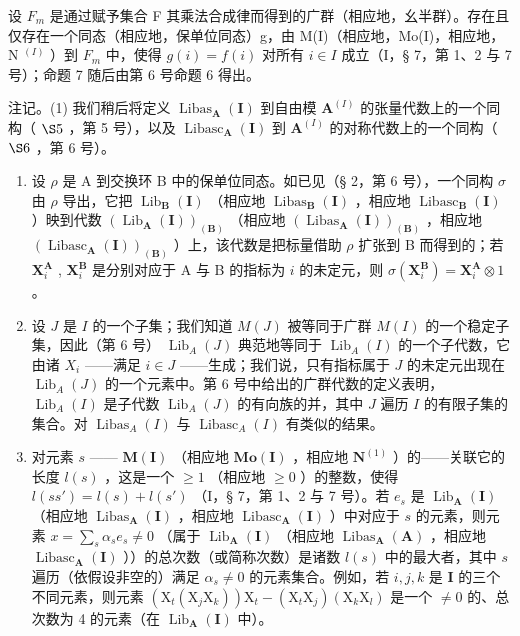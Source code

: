 设 \(F_{m}\) 是通过赋予集合 F 其乘法合成律而得到的广群（相应地，幺半群）。存在且仅存在一个同态（相应地，保单位同态）g，由 M(I)（相应地，Mo(I)，相应地，N \(^{(I)}\) ）到 \(F_{m}\) 中，使得 \(g(i) = f(i)\) 对所有 \(i \in I\) 成立（I，§ 7，第 1、2 与 7 号）；命题 7 随后由第 6 号命题 6 得出。

注记。(1) 我们稍后将定义 \(\operatorname{Libas}_{\mathbf{A}}(\mathbf{I})\) 到自由模 \(\mathbf{A}^{(I)}\) 的张量代数上的一个同构（ \(\S 5\) ，第 5 号），以及 \(\operatorname{Libasc}_{\mathbf{A}}(\mathbf{I})\) 到 \(\mathbf{A}^{(I)}\) 的对称代数上的一个同构（ \(\S 6\) ，第 6 号）。

\begin{enumerate}
\def\labelenumi{(\arabic{enumi})}
\setcounter{enumi}{1}
\item
  设 \(\rho\) 是 A 到交换环 B 中的保单位同态。如已见（§ 2，第 6 号），一个同构 \(\sigma\) 由 \(\rho\) 导出，它把 \(\operatorname{Lib}_{\mathbf{B}}(\mathbf{I})\) （相应地 \(\operatorname{Libas}_{\mathbf{B}}(\mathbf{I})\) ，相应地 \(\operatorname{Libasc}_{\mathbf{B}}(\mathbf{I})\) ）映到代数 \((\operatorname{Lib}_{\mathbf{A}}(\mathbf{I}))_{(\mathbf{B})}\) （相应地 \((\operatorname{Libas}_{\mathbf{A}}(\mathbf{I}))_{(\mathbf{B})}\) ，相应地 \((\operatorname{Libasc}_{\mathbf{A}}(\mathbf{I}))_{(\mathbf{B})}\) ）上，该代数是把标量借助 \(\rho\) 扩张到 B 而得到的；若 \(\mathbf{X}_i^{\mathbf{A}}\) , \(\mathbf{X}_i^{\mathbf{B}}\) 是分别对应于 A 与 B 的指标为 \(i\) 的未定元，则 \(\sigma(\mathbf{X}_i^{\mathbf{B}}) = \mathbf{X}_i^{\mathbf{A}} \otimes 1\) 。
\item
  设 \(J\) 是 \(I\) 的一个子集；我们知道 \(M(J)\) 被等同于广群 \(M(I)\) 的一个稳定子集，因此（第 6 号） \(\operatorname{Lib}_{A}(J)\) 典范地等同于 \(\operatorname{Lib}_{A}(I)\) 的一个子代数，它由诸 \(X_i\) ——满足 \(i \in J\) ——生成；我们说，只有指标属于 \(J\) 的未定元出现在 \(\operatorname{Lib}_{A}(J)\) 的一个元素中。第 6 号中给出的广群代数的定义表明， \(\operatorname{Lib}_{A}(I)\) 是子代数 \(\operatorname{Lib}_{A}(J)\) 的有向族的并，其中 \(J\) 遍历 \(I\) 的有限子集的集合。对 \(\operatorname{Libas}_{A}(I)\) 与 \(\operatorname{Libasc}_{A}(I)\) 有类似的结果。
\item
  对元素 \(s\) —— \(\mathbf{M}(\mathbf{I})\) （相应地 \(\mathbf{Mo}(\mathbf{I})\) ，相应地 \(\mathbf{N}^{(1)}\) ）的——关联它的长度 \(l(s)\) ，这是一个 \(\geqslant 1\) （相应地 \(\geqslant 0\) ）的整数，使得 \(l(ss') = l(s) + l(s')\) （I，§ 7，第 1、2 与 7 号）。若 \(e_s\) 是 \(\operatorname{Lib}_{\mathbf{A}}(\mathbf{I})\) （相应地 \(\operatorname{Libas}_{\mathbf{A}}(\mathbf{I})\) ，相应地 \(\operatorname{Libasc}_{\mathbf{A}}(\mathbf{I})\) ）中对应于 \(s\) 的元素，则元素 \(x = \sum_{s} \alpha_s e_s \neq 0\) （属于 \(\operatorname{Lib}_{\mathbf{A}}(\mathbf{I})\) （相应地 \(\operatorname{Libas}_{\mathbf{A}}(\mathbf{A})\) ，相应地 \(\operatorname{Libasc}_{\mathbf{A}}(\mathbf{I})\) ））的总次数（或简称次数）是诸数 \(l(s)\) 中的最大者，其中 \(s\) 遍历（依假设非空的）满足 \(\alpha_s \neq 0\) 的元素集合。例如，若 \(i, j, k\) 是 \(\mathbf{I}\) 的三个不同元素，则元素 \((\mathrm{X}_t(\mathrm{X}_j\mathrm{X}_k))\mathrm{X}_t - (\mathrm{X}_t\mathrm{X}_j)(\mathrm{X}_k\mathrm{X}_l)\) 是一个 \(\neq 0\) 的、总次数为 4 的元素（在 \(\operatorname{Lib}_{\mathbf{A}}(\mathbf{I})\) 中）。
\end{enumerate}

